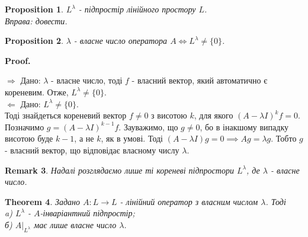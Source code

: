\documentclass[a4paper, 10pt]{article}
\makeatletter
\def\rightproof{$\boxed{\Rightarrow}$ }
\def\leftproof{$\boxed{\Leftarrow}$ }
\theoremstyle{theoremdd}
\newtheorem{theorem}{Theorem}[subsection]
\newtheorem{proposition}[theorem]{Proposition}
\newtheorem{remark}[theorem]{Remark}
\renewenvironment{proof}[1][Proof.\\]{\par
\pushQED{\hfill \qed}%
\normalfont \topsep6\p@\@plus6\p@\relax
\trivlist
\item\relax
{\bfseries
#1\@addpunct{.}}\hspace\labelsep\ignorespaces
}{%
\popQED\endtrivlist\@endpefalse
}
\makeatother
\begin{document}
\begin{proposition}
$L^\lambda$ - підпростір лінійного простору $L$.\\
\textit{Вправа: довести.}
\end{proposition}

\begin{proposition}
$\lambda$ - власне число оператора $A \iff L^\lambda \neq \{0\}$.
\end{proposition}

\begin{proof}
\rightproof Дано: $\lambda$ - власне число, тоді $f$ - власний вектор, який автоматично є кореневим. Отже, $L^\lambda \neq \{0\}$.
\bigskip \\
\leftproof Дано: $L^\lambda \neq \{0\}$.\\
Тоді знайдеться кореневий вектор $f \neq 0$ з висотою $k$, для якого $(A-\lambda I)^k f = 0$.\\
Позначимо $g = (A-\lambda I)^{k-1} f$. Зауважимо, що $g \neq 0$, бо в інакшому випадку висотою буде $k-1$, а не $k$, як в умові. Тоді $(A-\lambda I) g = 0 \implies Ag = \lambda g$. Тобто $g$ - власний вектор, що відповідає власному числу $\lambda$.
\end{proof}

\begin{remark}
Надалі розглядаємо лише ті кореневі підпростори $L^\lambda$, де $\lambda$ - власне число.
\end{remark}

\begin{theorem}
Задано $A: L \to L$ - лінійний оператор з власним числом $\lambda$. Тоді\\
a) $L^\lambda$ - $A$-інваріантний підпростір;\\
б) $A|_{L^\lambda}$ має лише власне число $\lambda$.
\end{theorem}
\end{document}
